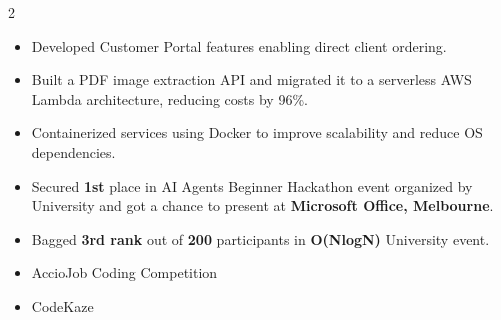 \documentclass[10pt,a4paper]{altacv}
\begin{document}
\begin{paracol}{2}
\begin{itemize}
\item Developed Customer Portal features enabling direct client ordering.
\item Built a PDF image extraction API and migrated it to a serverless AWS Lambda architecture, reducing costs by 96\%.
\item Containerized services using Docker to improve scalability and reduce OS dependencies.
\end{itemize}

\switchcolumn



\vspace{0.3cm}



\vspace{0.3cm}



\vspace{0.3cm}


\begin{itemize}
\item Secured \textbf{1st} place in AI Agents Beginner Hackathon event organized by University and got a chance to present at \textbf{Microsoft Office, Melbourne}.
\item Bagged \textbf{3rd rank} out of \textbf{200} participants in \textbf{O(NlogN)} University event.
\end{itemize}

\vspace{0.3cm}


\begin{itemize}
\item AccioJob Coding Competition
\item CodeKaze
\end{itemize}


\end{paracol}
\end{document}
